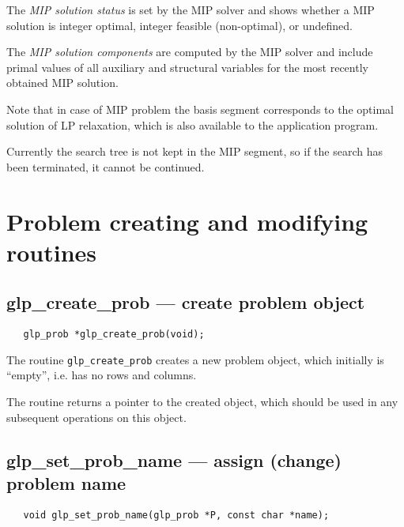 The {\it MIP solution status} is set by the MIP solver and shows whether
a MIP solution is integer optimal, integer feasible (non-optimal), or
undefined.

The {\it MIP solution components} are computed by the MIP solver and
include primal values of all auxiliary and structural variables for the
most recently obtained MIP solution.

Note that in case of MIP problem the basis segment corresponds to
the optimal solution of LP relaxation, which is also available to the
application program.

Currently the search tree is not kept in the MIP segment, so if the
search has been terminated, it cannot be continued.


\newpage

\section{Problem creating and modifying routines}

\subsection{glp\_create\_prob --- create problem object}

\synopsis

\begin{verbatim}
   glp_prob *glp_create_prob(void);
\end{verbatim}

\description

The routine \verb|glp_create_prob| creates a new problem object, which
initially is ``empty'', i.e. has no rows and columns.

\returns

The routine returns a pointer to the created object, which should be
used in any subsequent operations on this object.

\subsection{glp\_set\_prob\_name --- assign (change) problem name}

\synopsis

\begin{verbatim}
   void glp_set_prob_name(glp_prob *P, const char *name);
\end{verbatim}

